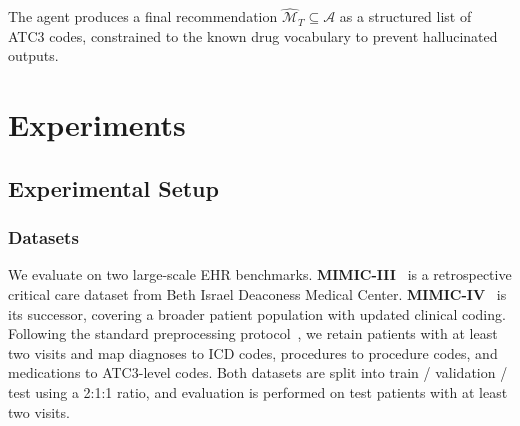 \documentclass[sigconf,anonymous]{acmart}
\begin{document}
The agent produces a final recommendation $\hat{\mathcal{M}}_T \subseteq \mathcal{A}$ as a structured list of ATC3 codes, constrained to the known drug vocabulary to prevent hallucinated outputs.

\section{Experiments}

\subsection{Experimental Setup}

\subsubsection{Datasets}
We evaluate on two large-scale EHR benchmarks. \textbf{MIMIC-III}~\cite{mimic3} is a retrospective critical care dataset from Beth Israel Deaconess Medical Center. \textbf{MIMIC-IV}~\cite{mimic3} is its successor, covering a broader patient population with updated clinical coding. Following the standard preprocessing protocol~\cite{gamenet,safedrug}, we retain patients with at least two visits and map diagnoses to ICD codes, procedures to procedure codes, and medications to ATC3-level codes. Both datasets are split into train / validation / test using a 2:1:1 ratio, and evaluation is performed on test patients with at least two visits.
\end{document}

